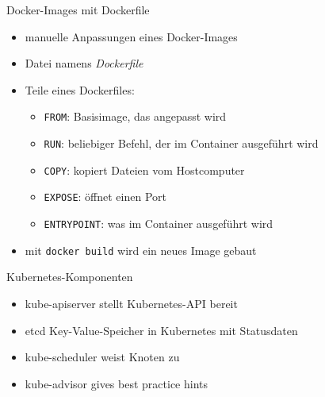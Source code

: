


\begin{flashcard}[Definition]{Docker-Images mit Dockerfile}
    \begin{itemize}
        \item manuelle Anpassungen eines Docker-Images
        \item Datei namens \emph{Dockerfile}
        \item Teile eines Dockerfiles:
            \begin{itemize}
                \item \texttt{FROM}: Basisimage, das angepasst wird
                \item \texttt{RUN}: beliebiger Befehl, der im Container ausgeführt wird
                \item \texttt{COPY}: kopiert Dateien vom Hostcomputer
                \item \texttt{EXPOSE}: öffnet einen Port
                \item \texttt{ENTRYPOINT}: was im Container ausgeführt wird
            \end{itemize}
        \item mit \texttt{docker build} wird ein neues Image gebaut
    \end{itemize}
\end{flashcard}


\begin{flashcard}[Definition]{Kubernetes-Komponenten}
    \begin{itemize}
        \item kube-apiserver\newline
            stellt Kubernetes-API bereit
        \item etcd\newline
            Key-Value-Speicher in Kubernetes mit Statusdaten
        \item kube-scheduler\newline
            weist Knoten zu
        \item kube-advisor\newline
            gives best practice hints
    \end{itemize}
\end{flashcard}


